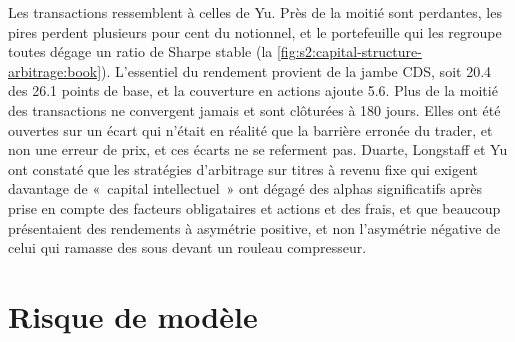 Les transactions ressemblent à celles de Yu. Près de la moitié sont perdantes, les pires perdent plusieurs pour cent du notionnel, et le portefeuille qui les regroupe toutes dégage un ratio de Sharpe stable
(la \cref{fig:s2:capital-structure-arbitrage:book}). L'essentiel du rendement provient de la jambe CDS, soit 20.4 des 26.1 points de base, et la couverture en actions ajoute
5.6. Plus de la moitié des transactions ne convergent jamais et sont clôturées à 180 jours. Elles ont été ouvertes sur un écart qui n'était en réalité que la barrière erronée du trader, et non une
erreur de prix, et ces écarts ne se referment pas. Duarte, Longstaff et Yu ont constaté que les stratégies d'arbitrage sur titres à revenu fixe qui exigent davantage de «~capital intellectuel~»
ont dégagé des alphas significatifs après prise en compte des facteurs obligataires et actions et des frais, et que beaucoup présentaient des rendements à asymétrie positive, et non l'asymétrie négative de
celui qui ramasse des sous devant un rouleau compresseur.

\begin{omfigure}

\label{fig:s2:capital-structure-arbitrage:book}
\end{omfigure}

\section{Risque de modèle}

